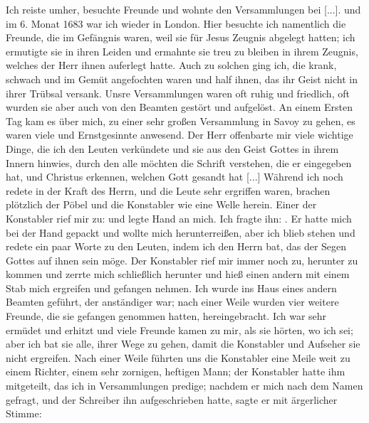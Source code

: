 Ich reiste umher, besuchte Freunde und wohnte den Versammlungen 
bei [...]. und im 6. Monat 1683 war ich wieder
in London. Hier besuchte ich namentlich die Freunde, die im
Gefängnis waren, weil sie für Jesus 
Zeugnis abgelegt hatten;
ich ermutigte sie in ihren Leiden und ermahnte sie treu zu bleiben
in ihrem Zeugnis, welches der Herr ihnen auferlegt hatte. Auch
zu solchen ging ich, die krank, schwach und im Gemüt angefochten
waren und half ihnen, das ihr Geist nicht in ihrer Trübsal 
versank. Unsre Versammlungen waren oft ruhig und friedlich, oft
wurden sie aber auch von den Beamten gestört und aufgelöst.
An einem Ersten Tag kam es über mich, zu einer sehr großen
Versammlung in Savoy zu gehen, es waren viele  und
Ernstgesinnte anwesend. Der Herr offenbarte mir viele wichtige
Dinge, die ich den Leuten verkündete und sie aus den Geist
Gottes in ihrem Innern hinwies, durch den alle möchten die
Schrift verstehen, die er 
eingegeben hat, und Christus erkennen,
welchen Gott gesandt hat [...] Während ich noch redete in der
Kraft des Herrn, und die Leute sehr ergriffen waren, brachen
plötzlich der Pöbel und die Konstabler wie eine Welle herein.
Einer der Konstabler rief mir zu:  und legte
Hand an mich. Ich fragte ihn: . Er hatte mich bei der Hand gepackt und wollte mich
herunterreißen, aber ich blieb stehen und redete ein paar Worte
zu den Leuten, indem ich den Herrn bat, das der Segen Gottes
auf ihnen sein möge. Der Konstabler rief mir immer noch zu,
herunter zu kommen und zerrte mich schließlich herunter und hieß
einen andern mit einem Stab mich ergreifen und gefangen nehmen.
Ich wurde ins Haus eines andern Beamten geführt, der anständiger 
war; nach einer Weile wurden vier weitere Freunde,
die sie gefangen genommen hatten, hereingebracht. Ich war sehr
ermüdet und erhitzt und viele Freunde kamen zu mir, als sie
hörten, wo ich sei; aber ich bat sie alle, ihrer Wege zu gehen,
damit die Konstabler und Aufseher sie nicht ergreifen. Nach einer
Weile führten uns die Konstabler eine Meile weit zu einem Richter,
einem sehr zornigen, heftigen Mann; der Konstabler hatte ihm mitgeteilt, 
das ich in Versammlungen predige; nachdem er mich nach dem
Namen gefragt, und der Schreiber ihn aufgeschrieben hatte, sagte er
mit ärgerlicher Stimme: 
